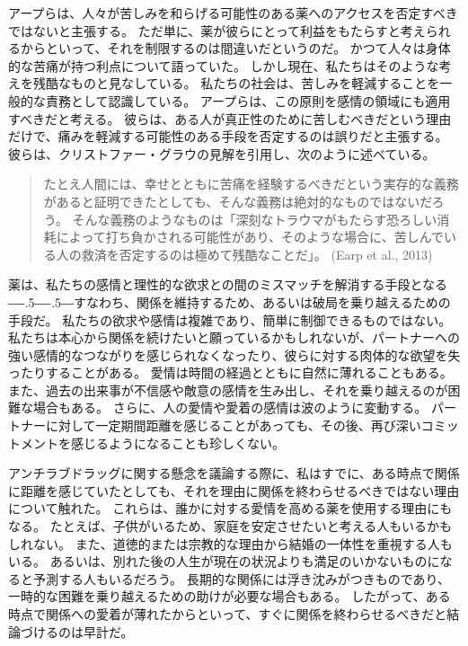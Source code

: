 \documentclass[paper=a4,book,openany]{jlreq}
\newcommand{\ig}[1]{}           %
\def\DDASH{―\kern-.5\zw―\kern-.5\zw―}
\begin{document}
アープらは、人々が苦しみを和らげる可能性のある薬へのアクセスを否定すべきではないと主張する。
ただ単に、薬が彼らにとって利益をもたらすと考えられるからといって、それを制限するのは間違いだというのだ。
かつて人々は身体的な苦痛が持つ利点について語っていた。
しかし現在、私たちはそのような考えを残酷なものと見なしている。
私たちの社会は、苦しみを軽減することを一般的な責務として認識している。
アープらは、この原則を感情の領域にも適用すべきだと考える。
彼らは、ある人が真正性のために苦しむべきだという理由だけで、痛みを軽減する可能性のある手段を否定するのは誤りだと主張する。
彼らは、クリストファー・グラウ\ig{(Christopher Grau)}の見解\citep{grau06:_etern_sunsh_spotl_mind_moral_memor}を引用し、次のように述べている。

\begin{quote}
たとえ人間には、幸せとともに苦痛を経験するべきだという実存的な義務があると証明できたとしても、そんな義務は絶対的なものではないだろう。
そんな義務のようなものは「深刻なトラウマがもたらす恐ろしい消耗によって打ち負かされる可能性があり、そのような場合に、苦しんでいる人の救済を否定するのは極めて残酷なことだ」。
(Earp et al., 2013\ig{, p.13. \citet{grau06:_etern_sunsh_spotl_mind_moral_memor}を引用している})
  \nocite{earp13:_if_i_could_just_stop_lovin_you}

\end{quote}

薬は、私たちの感情と理性的な欲求との間のミスマッチを解消する手段となる{\DDASH}すなわち、関係を維持するため、あるいは破局を乗り越えるための手段だ。
私たちの欲求や感情は複雑であり、簡単に制御できるものではない。
私たちは本心から関係を続けたいと願っているかもしれないが、パートナーへの強い感情的なつながりを感じられなくなったり、彼らに対する肉体的な欲望を失ったりすることがある。
愛情は時間の経過とともに自然に薄れることもある。
また、過去の出来事が不信感や敵意の感情を生み出し、それを乗り越えるのが困難な場合もある。
さらに、人の愛情や愛着の感情は波のように変動する。
パートナーに対して一定期間距離を感じることがあっても、その後、再び深いコミットメントを感じるようになることも珍しくない。

アンチラブドラッグに関する懸念を議論する際に、私はすでに、ある時点で関係に距離を感じていたとしても、それを理由に関係を終わらせるべきではない理由について触れた。
これらは、誰かに対する愛情を高める薬を使用する理由にもなる。
たとえば、子供がいるため、家庭を安定させたいと考える人もいるかもしれない。
また、道徳的または宗教的な理由から結婚の一体性を重視する人もいる。
あるいは、別れた後の人生が現在の状況よりも満足のいかないものになると予測する人もいるだろう。
長期的な関係には浮き沈みがつきものであり、一時的な困難を乗り越えるための助けが必要な場合もある。
したがって、ある時点で関係への愛着が薄れたからといって、すぐに関係を終わらせるべきだと結論づけるのは早計だ。
\end{document}
